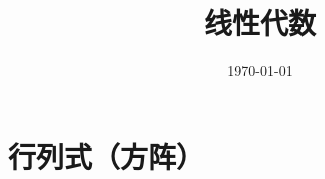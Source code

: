 \documentclass{article}
\title{线性代数}
\author{}
\date{\today}
\begin{document}
\hypersetup{
    hidelinks,
    allcolors = black,
    breaklinks = true
}

\newtheorem{definition}{Definition}[subsection]
\newtheorem{theorem}{Theorem}[subsection]
\newtheorem{corollary}{Corollary}[theorem]
\renewcommand{\proofname}{\indent\bf Proof}

\def\sr{\mathbb R}
\def\v{\boldsymbol v}
\def\w{\boldsymbol w}
\def\ev{\boldsymbol e}
\def\pv{\boldsymbol p}
\def\av{\boldsymbol\alpha}
\def\bv{\boldsymbol\beta}
\def\xv{\boldsymbol x}
\def\yv{\boldsymbol y}

\newcommand{\abs}[1]{\left|#1\right|}
\newcommand{\norm}[1]{\left\Vert#1\right\Vert}
\newcommand{\p}[1]{\left(#1\right)}
\newcommand{\B}[1]{\left\{#1\right\}}

\begin{titlepage}
    \maketitle
\end{titlepage}

\tableofcontents
\newpage

\section{行列式（方阵）}
\end{document}
